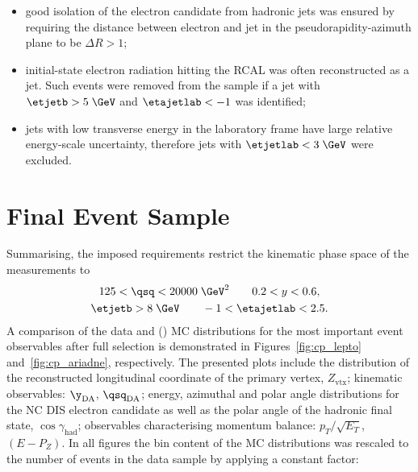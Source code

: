 \begin{itemize}
	\item good isolation of the electron candidate from hadronic jets was ensured by requiring the distance between electron and jet in the pseudorapidity-azimuth plane to be $\Delta R > 1$;
	\item initial-state electron radiation hitting the RCAL was often reconstructed as a jet. Such events were removed from the sample if a jet with $\etjetb > 5\;\GeV$ and $\etajetlab < -1$ was identified;
	\item jets with low transverse energy in the laboratory frame have large relative energy-scale uncertainty, therefore jets with $\etjetlab < 3\;\GeV$ were excluded.
\end{itemize}

\section{Final Event Sample}
\label{sec:eventsampletab}
Summarising, the imposed requirements restrict the kinematic phase space of the measurements to
\begin{gather}
125 < \qsq < 20000\;\GeV^2 \qquad 0.2 < y < 0.6, \label{eq:kinematicphasespacecuts}\\
\etjetb > 8\;\GeV \qquad -1 < \etajetlab < 2.5. \label{eq:jetphasespacecuts}
\end{gather}
A comparison of the data and \ariadne (\lepto) MC distributions for the most important event observables after full selection is demonstrated in Figures~\ref{fig:cp_lepto} and~\ref{fig:cp_ariadne}, respectively. The presented plots include the distribution of the reconstructed longitudinal coordinate of the primary vertex, $Z_\text{vtx}$; kinematic observables: $\y_\text{DA}$, $\qsq_\text{DA}$; energy, azimuthal and polar angle distributions for the NC DIS electron candidate as well as the polar angle of the hadronic final state, $\cos{\gamma_\text{had}}$; observables characterising momentum balance: $p_T/\sqrt{E_T}$, $\left(E-P_Z\right)$. In all figures the bin content of the MC distributions was rescaled to the number of events in the data sample by applying a constant factor:
